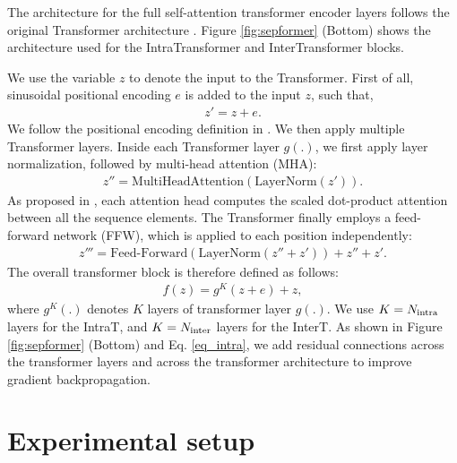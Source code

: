 \documentclass[lettersize,journal]{IEEEtran}
\begin{document}
The architecture for the full self-attention transformer encoder layers follows the original Transformer architecture \cite{vaswani2017}. Figure \ref{fig:sepformer} (Bottom) shows the architecture used for the IntraTransformer and InterTransformer blocks. 

We use the variable $z$ to denote the input to the Transformer. First of all, sinusoidal positional encoding $e$ is added to the input $z$, such that, 
\begin{align}
    z' = z + e.
\end{align}
We follow the positional encoding definition in \cite{vaswani2017}. 
We then apply multiple Transformer layers. 
Inside each Transformer layer $g(.)$, we first apply layer normalization, followed by multi-head attention (MHA):
\begin{align}
    z''= \text{MultiHeadAttention}(\text{LayerNorm}(z')).
\end{align}
As proposed in \cite{vaswani2017}, each attention head computes the scaled dot-product attention between all the sequence elements.
The Transformer finally employs a feed-forward network (FFW), which is applied to each position independently:
\begin{align}
    z''' = \text{Feed-Forward}(\text{LayerNorm}(z''+ z') ) + z'' + z'.
    \label{eq_ff}
\end{align}
The overall transformer block is therefore defined as follows:
\begin{align}
    f(z) =  g^K (z+e) + z, 
    \label{eq_intra}
\end{align}
where $g^K(.)$ denotes $K$ layers of transformer layer $g(.)$. We use $K=N_\text{intra}$ layers for the IntraT, and $K=N_\text{inter}$ layers for the InterT.
As shown in Figure \ref{fig:sepformer} (Bottom) and Eq. \eqref{eq_intra}, we add residual connections across the transformer layers and across the transformer architecture to improve gradient backpropagation. 




\section{Experimental setup}
\label{sec:experiments}
\end{document}
